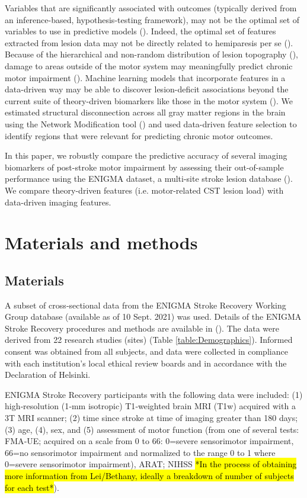 \documentclass[10pt]{article}
\begin{document}
Variables that are significantly associated with outcomes (typically derived from an inference-based, hypothesis-testing framework), may not be the optimal set of variables to use in predictive models (\cite{Bzdok2020-py}). Indeed, the optimal set of features extracted from lesion data may not be directly related to hemiparesis per se (\cite{Sperber2021-lw}). Because of the hierarchical and non-random distribution of lesion topography (\cite{Mah2014-cb,Wang2019-dz}), damage to areas outside of the motor system may meaningfully predict chronic motor impairment (\cite{Sperber2021-lw}). Machine learning models that incorporate features in a data-driven way may be able to discover lesion-deficit associations beyond the current suite of theory-driven biomarkers like those in the motor system (\cite{Kasties2021-rm, Calesella2021-kp}). We estimated structural disconnection across all gray matter regions in the brain using the Network Modification tool (\cite{Kuceyeski2013-nk}) and used data-driven feature selection to identify regions that were relevant for predicting chronic motor outcomes. 



In this paper, we robustly compare the predictive accuracy of several imaging biomarkers of post-stroke motor impairment by assessing their out-of-sample performance using the ENIGMA dataset, a multi-site stroke lesion database (\cite{Liew2020-ps}). We compare theory-driven features (i.e. motor-related CST lesion load) with data-driven imaging features. 


\section{Materials and methods}
\subsection{Materials}
A subset of cross‐sectional data from the ENIGMA Stroke Recovery Working Group database (available as of 10 Sept. 2021) was used. Details of the ENIGMA Stroke Recovery procedures and methods are available in (\cite{Liew2020-ps}). The data were derived from 22 research studies (sites) (Table \ref{table:Demographics}). Informed consent was obtained from all subjects, and data were collected in compliance with each institution’s local ethical review boards and in accordance with the Declaration of Helsinki.

ENIGMA Stroke Recovery participants with the following data were included: (1) high‐resolution (1‐mm isotropic) T1‐weighted brain MRI (T1w) acquired with a 3T MRI scanner; (2) time since stroke at time of imaging greater than 180 days; (3) age, (4), sex, and (5) assessment of motor function (from one of several tests: FMA‐UE; acquired on a scale from 0 to 66: 0=severe sensorimotor impairment, 66=no sensorimotor impairment and normalized to the range 0 to 1 where 0=severe sensorimotor impairment), ARAT; NIHSS \hl{*In the process of obtaining more information from Lei/Bethany, ideally a breakdown of number of subjects for each test*}). 
\end{document}

